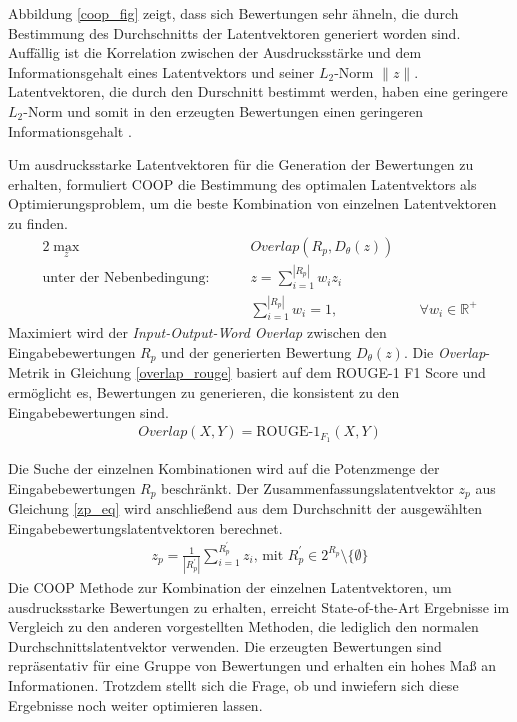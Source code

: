 Abbildung \ref{coop_fig} zeigt, dass sich Bewertungen sehr ähneln, die durch Bestimmung des Durchschnitts der Latentvektoren generiert worden sind. 
Auffällig ist die Korrelation zwischen der Ausdrucksstärke und dem Informationsgehalt eines Latentvektors und seiner $L_2$-Norm $\| z \|$.
Latentvektoren, die durch den Durschnitt bestimmt werden, haben eine geringere $L_2$-Norm und somit in den erzeugten Bewertungen einen geringeren Informationsgehalt \citep{coop}.

Um ausdrucksstarke Latentvektoren für die Generation der Bewertungen zu erhalten, formuliert COOP \citep{coop} die Bestimmung des optimalen Latentvektors als Optimierungsproblem, um die beste Kombination von einzelnen Latentvektoren zu finden.
\begin{alignat*}{2}
    \max_z              &\quad&  Overlap(R_p, D_\theta(z))    & \\
    \text{unter der Nebenbedingung: } &\quad&  z = \sum_{i=1}^{|R_p|} w_i z_i \\
                         &\quad&  \sum_{i=1}^{|R_p|}w_i=1,                        &\quad \forall w_i \in \mathbb{R}^+
\end{alignat*}
Maximiert wird der \textit{Input-Output-Word Overlap} zwischen den Eingabebewertungen $R_p$ und der generierten Bewertung $D_\theta(z)$. 
Die \textit{Overlap}-Metrik in Gleichung \ref{overlap_rouge} basiert auf dem ROUGE-1 F1 Score und ermöglicht es, Bewertungen zu generieren, die konsistent zu den Eingabebewertungen sind.
\begin{align}
    \label{overlap_rouge}
    Overlap(X,Y) = \text{ROUGE-1}_{F_1}(X,Y)
\end{align}

Die Suche der einzelnen Kombinationen wird auf die Potenzmenge der Eingabebewertungen $R_p$ beschränkt. 
Der Zusammenfassungslatentvektor $z_p$ aus Gleichung \ref{zp_eq} wird anschließend aus dem Durchschnitt der ausgewählten Eingabebewertungslatentvektoren berechnet.
\begin{align}
z_p = \frac{1}{|R_p^{'}|} \sum_{i=1}^{R_p^{'}}z_i \text{, mit } R_p^{'} \in 2^{R_p} \setminus  \{ \emptyset\} \label{zp_eq}
\end{align}
Die COOP Methode zur Kombination der einzelnen Latentvektoren, um ausdrucksstarke Bewertungen zu erhalten, erreicht State-of-the-Art Ergebnisse im Vergleich zu den anderen vorgestellten Methoden, die lediglich den normalen Durchschnittslatentvektor verwenden.
Die erzeugten Bewertungen sind repräsentativ für eine Gruppe von Bewertungen und erhalten ein hohes Maß an Informationen. 
Trotzdem stellt sich die Frage, ob und inwiefern sich diese Ergebnisse noch weiter optimieren lassen.

